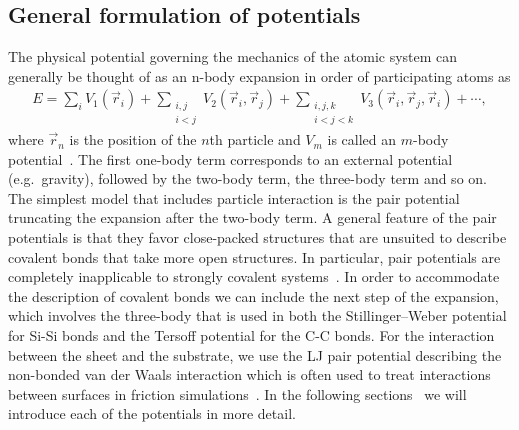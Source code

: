 \subsection{General formulation of potentials}
The physical potential governing the mechanics of the atomic system can
generally be thought of as an n-body expansion in order of participating
atoms as 
\begin{align*}
  E = \sum_i V_1(\vec{r}_i) + 
      \sum_{\substack{i, j \\ i < j}} V_2(\vec{r}_i, \vec{r}_j) +  
      \sum_{\substack{i,j,k \\ i < j < k}} V_3(\vec{r}_i, \vec{r}_j, \vec{r}_i) + \cdots,
\end{align*} 
where $\vec{r}_n$ is the position of the $n$th particle and $V_m$ is called an
$m$-body potential~\cite{PhysRevB.37.6991}. The first one-body term corresponds
to an external potential (e.g.\ gravity), followed by the two-body term, the
three-body term and so on. The simplest model that includes particle interaction
is the pair potential truncating the expansion after the two-body term. A general feature of the pair potentials is that they favor close-packed
structures that are unsuited to describe covalent bonds that take more open
structures. In particular, pair potentials are completely inapplicable to
strongly covalent systems~\cite{PhysRevB.37.6991}. In order to accommodate the
description of covalent bonds we can include the next step
of the expansion, which involves the three-body that is used in both the Stillinger–Weber potential for Si-Si bonds and the Tersoff potential for the C-C bonds. For the interaction between the sheet and the substrate, we use the \acrshort{LJ} pair potential describing the non-bonded van der Waals interaction which is often used to treat interactions between surfaces in friction simulations~\cite{zhu_study_2018,ZHANG201585,Yoon2015MolecularDS,kim_nano-scale_2009}. In the following sections~ we will introduce each of the potentials in more detail.


